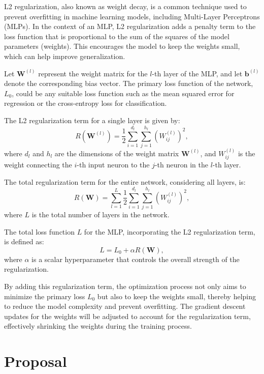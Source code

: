 L2 regularization, also known as weight decay, is a common technique used to prevent overfitting in machine learning models, including Multi-Layer Perceptrons (MLPs). In the context of an MLP, L2 regularization adds a penalty term to the loss function that is proportional to the sum of the squares of the model parameters (weights). This encourages the model to keep the weights small, which can help improve generalization.

Let $\mathbf{W}^{(l)}$ represent the weight matrix for the $l$-th layer of the MLP, and let $\mathbf{b}^{(l)}$ denote the corresponding bias vector. The primary loss function of the network, $L_0$, could be any suitable loss function such as the mean squared error for regression or the cross-entropy loss for classification.

The L2 regularization term for a single layer is given by:
\begin{equation}
R(\mathbf{W}^{(l)}) = \frac{1}{2} \sum_{i=1}^{d_l} \sum_{j=1}^{h_l} \left( W^{(l)}_{ij} \right)^2,
\end{equation}
where $d_l$ and $h_l$ are the dimensions of the weight matrix $\mathbf{W}^{(l)}$, and $W^{(l)}_{ij}$ is the weight connecting the $i$-th input neuron to the $j$-th neuron in the $l$-th layer.

The total regularization term for the entire network, considering all layers, is:
\begin{equation}
R(\mathbf{W}) = \sum_{l=1}^{L} \frac{1}{2} \sum_{i=1}^{d_l} \sum_{j=1}^{h_l} \left( W^{(l)}_{ij} \right)^2,
\end{equation}
where $L$ is the total number of layers in the network.

The total loss function $L$ for the MLP, incorporating the L2 regularization term, is defined as:
\begin{equation}
L = L_0 + \alpha R(\mathbf{W}),
\end{equation}
where $\alpha$ is a scalar hyperparameter that controls the overall strength of the regularization.

By adding this regularization term, the optimization process not only aims to minimize the primary loss $L_0$ but also to keep the weights small, thereby helping to reduce the model complexity and prevent overfitting. The gradient descent updates for the weights will be adjusted to account for the regularization term, effectively shrinking the weights during the training process.


\section{Proposal}

